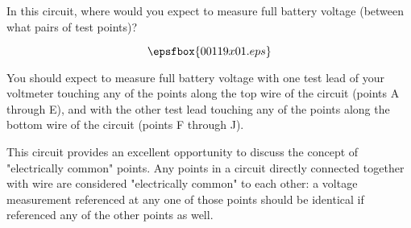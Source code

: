 

In this circuit, where would you expect to measure full battery voltage (between what pairs of test points)?

$$\epsfbox{00119x01.eps}$$







You should expect to measure full battery voltage with one test lead of your voltmeter touching any of the points along the top wire of the circuit (points A through E), and with the other test lead touching any of the points along the bottom wire of the circuit (points F through J).







This circuit provides an excellent opportunity to discuss the concept of "electrically common" points.  Any points in a circuit directly connected together with wire are considered "electrically common" to each other: a voltage measurement referenced at any one of those points should be identical if referenced any of the other points as well.




